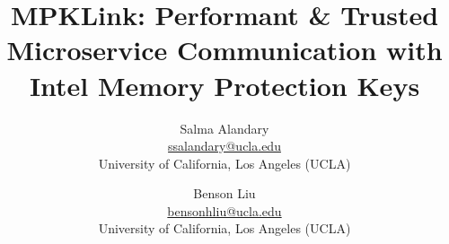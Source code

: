 \documentclass[letterpaper,twocolumn,10pt]{article}
\begin{document}

\date{}

\title{\Large \bf MPKLink: Performant \& Trusted Microservice Communication with Intel Memory Protection Keys}

\author{
{\rm Salma Alandary}\\
\url{ssalandary@ucla.edu}\\
University of California, Los Angeles (UCLA)
\and
{\rm Benson Liu}\\
\url{bensonhliu@ucla.edu}\\
University of California, Los Angeles (UCLA)
} %

\maketitle
\end{document}
